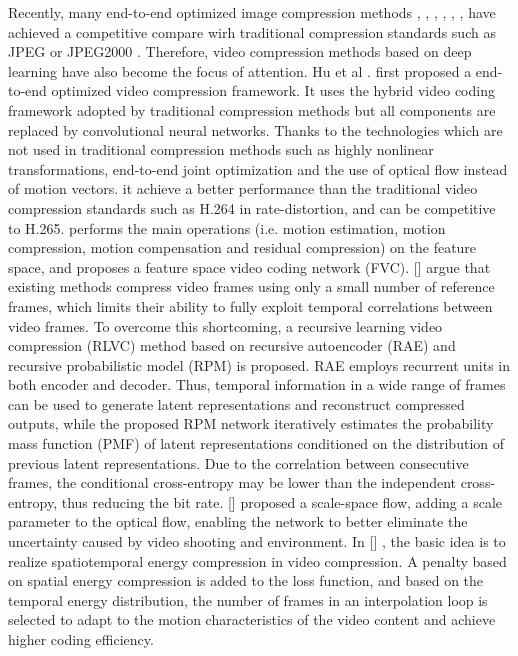 \documentclass[a4paper]{cas-sc}
\begin{document}
Recently, many end-to-end optimized image compression methods \cite{agustsson2017soft}, \cite{balle2016end}, \cite{balle2018variational},
\cite{johnston2018improved}, \cite{toderici2015variable}, \cite{toderici2017full},
have achieved a competitive compare wirh traditional compression standards such as JPEG \cite{wallace1991jpeg} or JPEG2000 \cite{skodras2001jpeg} . 
Therefore, video compression methods based on deep learning have also become the focus of attention. 
Hu et al . \cite{lu2019dvc} first proposed a end-to-end optimized video compression framework. 
It uses the hybrid video coding framework adopted by traditional compression methods but all components are replaced by 
convolutional neural networks.
Thanks to the technologies which are not used in traditional compression methods such as highly nonlinear transformations, 
end-to-end joint optimization and the use of optical flow instead of motion vectors.
it achieve a better performance than the traditional video compression standards such as H.264 
in rate-distortion, and can be competitive to H.265. 
\cite{hu2021fvc} performs the main operations (i.e. motion estimation, motion compression, motion compensation and residual compression) 
on the feature space, and proposes a feature space video coding network (FVC).
[] argue that existing methods compress video frames using only a small number of reference frames,
which limits their ability to fully exploit temporal correlations between video frames. 
To overcome this shortcoming, a recursive learning video compression (RLVC) method based on recursive autoencoder (RAE) 
and recursive probabilistic model (RPM) is proposed. 
RAE employs recurrent units in both encoder and decoder. 
Thus, temporal information in a wide range of frames can be used to generate latent representations and reconstruct compressed outputs,
while the proposed RPM network iteratively estimates the probability mass function (PMF) of latent representations conditioned 
on the distribution of previous latent representations. 
Due to the correlation between consecutive frames, 
the conditional cross-entropy may be lower than the independent cross-entropy, thus reducing the bit rate.
[] proposed a scale-space flow, 
adding a scale parameter to the optical flow, enabling the network to better eliminate the uncertainty 
caused by video shooting and environment. In [] , 
the basic idea is to realize spatiotemporal energy compression in video compression. 
A penalty based on spatial energy compression is added to the loss function, 
and based on the temporal energy distribution, 
the number of frames in an interpolation loop is selected to adapt to the motion characteristics of the video content and achieve 
higher coding efficiency.
\end{document}
